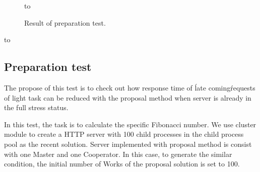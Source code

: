 \documentclass[JIP]{ipsj}
\begin{document}
\begin{figure}[t]
	\hbox to
	\caption{Result of preparation test.} 
	\label{fig:result_pre} 
\end{figure}

\begin{table}[tb]
\caption{The reduce rate of proposal solution compare with recent solution.}
\label{tab:raduce_rate_fib}
\hbox to
\end{table}



\subsection{Preparation test}

The propose of this test is to check out how response time of \'late coming\' requests of light task can be reduced with the proposal method when server is already in the full stress status.

In this test, the task is to calculate the specific Fibonacci number. We use cluster module to create a HTTP server with 100 child processes in the child process pool as the recent solution. Server implemented with proposal method is consist with one Master and one Cooperator. In this case, to generate the similar condition, the initial number of Works of the proposal solution is set to 100. 
\end{document}
